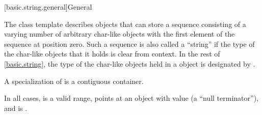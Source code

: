 [basic.string.general]{General}

\pnum
{}%
The
class template
describes objects that can store a sequence consisting of a varying number of
arbitrary char-like objects with the first element of the sequence at position zero.
Such a sequence is also called a ``string'' if the type of the
char-like objects that it holds
is clear from context.
In the rest of \ref{basic.string},
the type of the char-like objects held in a  object
is designated by .

\pnum
A specialization of  is a contiguous container.

\pnum
In all cases,
 is a valid range,
 points at an object with value 
(a ``null terminator''),
and  is .


